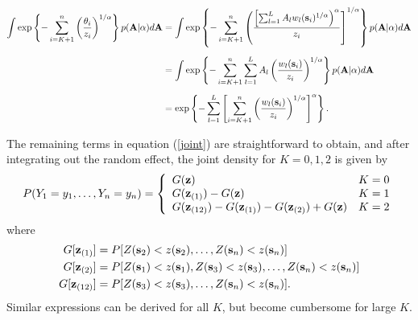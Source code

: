\begin{align}
  \int \exp \left\{ -\sum_{ i = K+1}^{ n }\left( \frac{ \theta_i }{ z_i } \right)^{1/\alpha} \right\} p( \mathbf{A} | \alpha) d\mathbf{A} &= \int \exp \left\{ - \sum_{ i = K + 1 }^n \left( \frac{ \left[ \sum_{ l = 1 }^L  A_l w_{l}(\mathbf{s}_i)^{1/\alpha} \right)^\alpha }{ z_i} \right]^{ 1/\alpha } \right \} p( \mathbf{A} | \alpha) d\mathbf{A} \nonumber \\[0.5em]
   &= \int \exp \left\{ -\sum_{ i = K + 1}^n \sum_{ l = 1}^L A_l \left( \frac{ w_l (\mathbf{s}_i) }{ z_i } \right)^{1/\alpha} \right \} p( \mathbf{A} | \alpha) d\mathbf{A} \nonumber \\[0.5em]
   &=\exp\left\{-\sum_{ l = 1}^L \left[ \sum_{ i = K + 1 }^n \left( \frac{ w_l(\mathbf{s}_i)}{ z_i} \right)^{1/\alpha} \right]^\alpha \right\}.
\end{align}

The remaining terms in equation (\ref{joint}) are straightforward to obtain, and after integrating out the random effect, the joint density for $K = 0, 1, 2$ is given by
\begin{align}\label{pmf}
  P(Y_1=y_1,\ldots,Y_n=y_n) =  \left\{
    \begin{array}{ll}
      G(\mathbf{z}) & K=0 \\
      G(\mathbf{z}_{(1)})-G(\mathbf{z}) & K=1 \\
      G(\mathbf{z}_{(12)})-G(\mathbf{z}_{(1)})-G(\mathbf{z}_{(2)})+G(\mathbf{z}) & K=2
    \end{array}
  \right.
\end{align}
where
\begin{align*}
  G[\mathbf{z}_{(1)}] &= P[Z(\mathbf{s}_2)<z(\mathbf{s}_2),\ldots,Z(\mathbf{s}_n)<z(\mathbf{s}_n)] \\
  G[\mathbf{z}_{(2)}] &= P[Z(\mathbf{s}_1)<z(\mathbf{s}_1),Z(\mathbf{s}_3)<z(\mathbf{s}_3),\ldots,Z(\mathbf{s}_n)<z(\mathbf{s}_n)]\\
  G[\mathbf{z}_{(12)}] &= P[Z(\mathbf{s}_3)<z(\mathbf{s}_3),\ldots,Z(\mathbf{s}_n)<z(\mathbf{s}_n)].
\end{align*}
Similar expressions can be derived for all $K$, but become cumbersome for large $K$.

